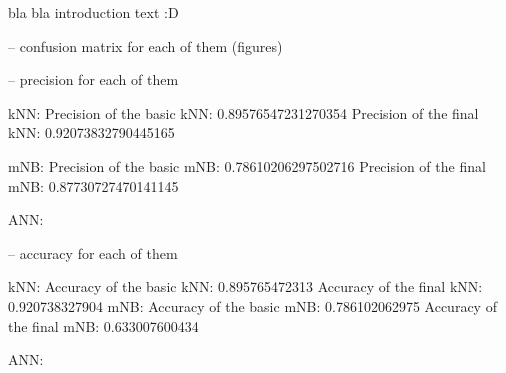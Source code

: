 bla bla introduction text :D


-- confusion matrix for each of them (figures)



-- precision for each of them

kNN:
Precision of the basic kNN: 0.89576547231270354
Precision of the final kNN: 0.92073832790445165

mNB:
Precision of the basic mNB: 0.78610206297502716
Precision of the final mNB: 0.87730727470141145

ANN:


-- accuracy for each of them

kNN:
Accuracy of the basic kNN: 0.895765472313
Accuracy of the final kNN: 0.920738327904
mNB:
Accuracy of the basic mNB: 0.786102062975
Accuracy of the final mNB: 0.633007600434

ANN:
